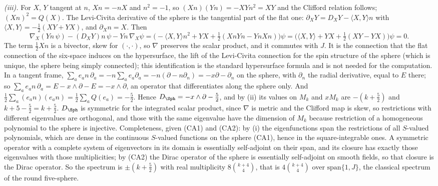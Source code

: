 \emph{(iii).} For $X$, $Y$ tangent at $n$, $Xn = -nX$ and $n^{2} = -1$, so $(Xn)(Yn) = -XYn^{2} = XY$ and the Clifford relation follows; $(Xn)^{2} = Q(X)$. The Levi-Civita derivative of the sphere is the tangential part of the flat one: $\partial_{X}Y = D_{X}Y - \langle X, Y\rangle n$ with $\langle X, Y\rangle = -\tfrac12(XY + YX)$, and $\partial_{X}n = X$. Then
\[
\nabla_{X}(Yn\,\psi) - (D_{X}Y)n\,\psi - Yn\,\nabla_{X}\psi = \bigl(-\langle X, Y\rangle n^{2} + YX + \tfrac12(XnYn - YnXn)\bigr)\psi = \bigl(\langle X, Y\rangle + YX + \tfrac12(XY - YX)\bigr)\psi = 0 .
\]
The term $\tfrac12Xn$ is a bivector, skew for $(\cdot, \cdot)$, so $\nabla$ preserves the scalar product, and it commutes with $J$. It is the connection that the flat connection of the six-space induces on the hypersurface, the lift of the Levi-Civita connection for the spin structure of the sphere (which is unique, the sphere being simply connected); this identification is the standard hypersurface formula and is not needed for the computation. In a tangent frame, $\sum_{a}e_{a}n\,\partial_{a} = -n\sum_{a}e_{a}\partial_{a} = -n(\partial - n\partial_{n}) = -x\partial - \partial_{n}$ on the sphere, with $\partial_{n}$ the radial derivative, equal to $E$ there; so $\sum_{a}e_{a}n\,\partial_{a} = E - x \wedge \partial - E = -x \wedge \partial$, an operator that differentiates along the sphere only. And $\tfrac12\sum_{a}(e_{a}n)(e_{a}n) = \tfrac12\sum_{a}Q(e_{a}) = -\tfrac52$. Hence $D_{\Sph} = -x \wedge \partial - \tfrac52$, and by (ii) its values on $M_{k}$ and $xM_{k}$ are $-(k + \tfrac52)$ and $k + 5 - \tfrac52 = k + \tfrac52$. $D_{\Sph}$ is symmetric for the integrated scalar product, since $\nabla$ is metric and the Clifford map is skew, so restrictions with different eigenvalues are orthogonal, and those with the same eigenvalue have the dimension of $M_{k}$ because restriction of a homogeneous polynomial to the sphere is injective. Completeness, given (CA1) and (CA2): by (i) the eigenfunctions span the restrictions of all $S$-valued polynomials, which are dense in the continuous $S$-valued functions on the sphere (CA1), hence in the square-integrable ones. A symmetric operator with a complete system of eigenvectors in its domain is essentially self-adjoint on their span, and its closure has exactly those eigenvalues with those multiplicities; by (CA2) the Dirac operator of the sphere is essentially self-adjoint on smooth fields, so that closure is the Dirac operator. So the spectrum is $\pm(k + \tfrac52)$ with real multiplicity $8\binom{k+4}{4}$, that is $4\binom{k+4}{4}$ over $\mathrm{span}\{1, J\}$, the classical spectrum of the round five-sphere.

